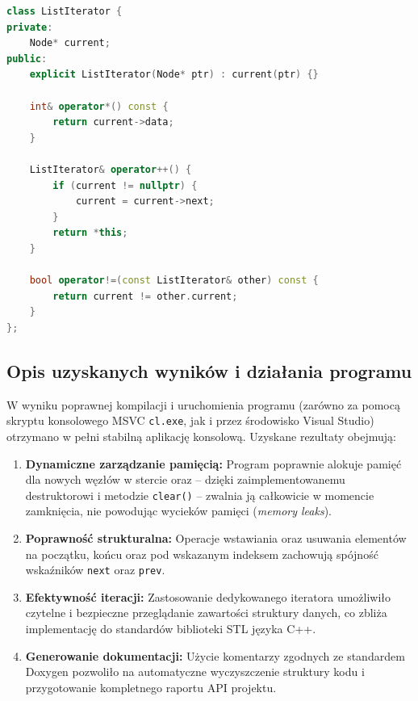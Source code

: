 \begin{lstlisting}[caption=Wzorzec projektowy - iterator, label={lst:listing-cpp}, language=C++]
class ListIterator {
private:
    Node* current;
public:
    explicit ListIterator(Node* ptr) : current(ptr) {}

    int& operator*() const {
        return current->data;
    }

    ListIterator& operator++() {
        if (current != nullptr) {
            current = current->next;
        }
        return *this;
    }

    bool operator!=(const ListIterator& other) const {
        return current != other.current;
    }
};
\end{lstlisting}

\subsection{Opis uzyskanych wyników i działania programu}
W wyniku poprawnej kompilacji i uruchomienia programu (zarówno za pomocą skryptu konsolowego MSVC \texttt{cl.exe}, jak i przez środowisko Visual Studio) otrzymano w pełni stabilną aplikację konsolową. Uzyskane rezultaty obejmują:
\begin{enumerate}
    \item \textbf{Dynamiczne zarządzanie pamięcią:} Program poprawnie alokuje pamięć dla nowych węzłów w stercie oraz – dzięki zaimplementowanemu destruktorowi i metodzie \texttt{clear()} – zwalnia ją całkowicie w momencie zamknięcia, nie powodując wycieków pamięci (\textit{memory leaks}).
    \item \textbf{Poprawność strukturalna:} Operacje wstawiania oraz usuwania elementów na początku, końcu oraz pod wskazanym indeksem zachowują spójność wskaźników \texttt{next} oraz \texttt{prev}.
    \item \textbf{Efektywność iteracji:} Zastosowanie dedykowanego iteratora umożliwiło czytelne i bezpieczne przeglądanie zawartości struktury danych, co zbliża implementację do standardów biblioteki STL języka C++.
    \item \textbf{Generowanie dokumentacji:} Użycie komentarzy zgodnych ze standardem Doxygen pozwoliło na automatyczne wyczyszczenie struktury kodu i przygotowanie kompletnego raportu API projektu.
\end{enumerate}